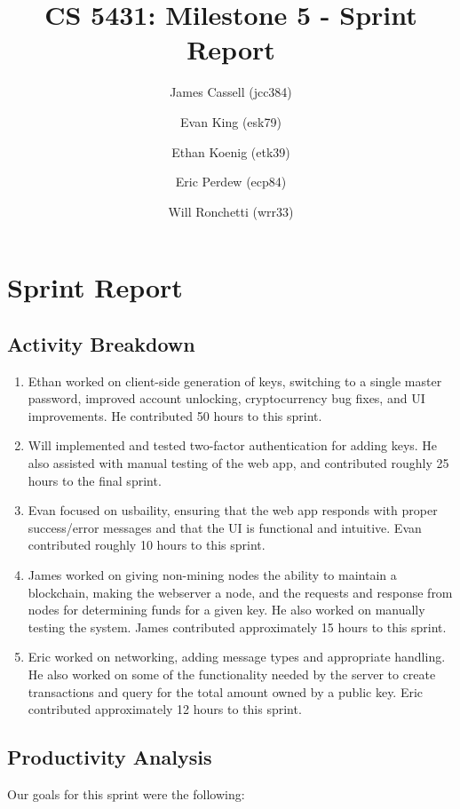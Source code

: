 \documentclass[a4paper,12pt]{article}
\title{CS 5431: Milestone 5 - Sprint Report}
\author{
James Cassell (jcc384)
\and
Evan King (esk79)
\and
Ethan Koenig (etk39)
\and
Eric Perdew (ecp84)
\and
Will Ronchetti (wrr33)
}
\begin{document}
\maketitle

\section{Sprint Report}

\subsection{Activity Breakdown}

\begin{enumerate} %
\item Ethan worked on client-side generation of keys, switching to a single master password, improved account unlocking, cryptocurrency bug fixes, and UI improvements. He contributed 50 hours to this sprint.
\item Will implemented and tested two-factor authentication for adding keys. He also assisted with manual testing of the web app, and contributed roughly 25 hours to the final sprint.
\item Evan focused on usbaility, ensuring that the web app responds with proper success/error messages and that the UI is functional and intuitive. Evan contributed roughly 10 hours to this sprint.
\item James worked on giving non-mining nodes the ability to maintain a blockchain, making the webserver a node, and the requests and response from nodes for determining funds for a given key.
  He also worked on manually testing the system.
  James contributed approximately 15 hours to this sprint.
\item Eric worked on networking, adding message types and appropriate handling.
He also worked on some of the functionality needed by the server to create transactions and query for the total amount owned by a public key.
Eric contributed approximately 12 hours to this sprint.
\end{enumerate}

\subsection{Productivity Analysis}

Our goals for this sprint were the following:
\end{document}
